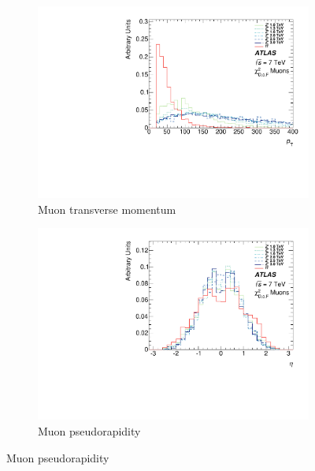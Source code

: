 \begin{figure}[htbp]
  \centering
  \begin{subfigure}{0.48\textwidth}
    \includegraphics[width=\textwidth]{PartBoosted/Plots/h_smt_pt.pdf}
    \caption{Muon transverse momentum} \label{fig:BoostedControlSMTpt}
  \end{subfigure}
  \begin{subfigure}{0.48\textwidth}
    \includegraphics[width=\textwidth]{PartBoosted/Plots/h_smt_eta.pdf}
    \caption{Muon pseudorapidity} \label{fig:BoostedControlSMTeta}
  \end{subfigure}


\end{figure}
